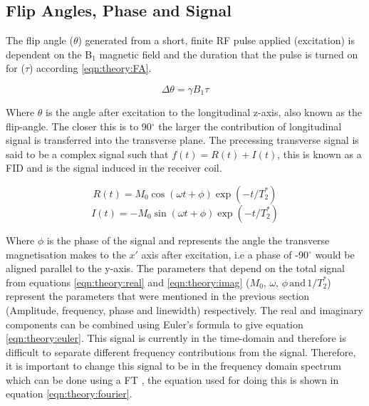 \subsection{Flip Angles, Phase and Signal}

The flip angle ($\theta$) generated from a short, finite \ac{RF} pulse applied (excitation) is dependent on the B$_1$ magnetic field and the duration that the pulse is turned on for ($\tau$) according \ref{eqn:theory:FA}.

\begin{equation}
    \Delta\theta = \gamma B_1 \tau
    \label{eqn:theory:FA}
\end{equation}

Where $\theta$ is the angle after excitation to the longitudinal z-axis, also known as the flip-angle. The closer this is to 90$^\circ$ the larger the contribution of longitudinal signal is transferred into the transverse plane. The precessing transverse signal is said to be a complex signal such that $f(t) = R(t) + I(t)$, this is known as a \ac{FID} and is the signal induced in the receiver coil.

\begin{equation}
    R(t) = M_0\cos(\omega t+ \phi)\exp(-t/T_2^*)
    \label{eqn:theory:real}
\end{equation}
\begin{equation}
    I(t) = -M_0\sin(\omega t+ \phi)\exp(-t/T_2^*)
    \label{eqn:theory:imag}
\end{equation}

Where $\phi$ is the phase of the signal and represents the angle the transverse magnetisation makes to the $x'$ axis after excitation, i.e a phase of -90$^\circ$ would be aligned parallel to the y-axis. The parameters that depend on the total signal from equations \ref{eqn:theory:real} and \ref{eqn:theory:imag} ($M_0, \, \omega, \, \phi \, \textrm{and} \, 1/T_2^*$) represent the parameters that were mentioned in the previous section (Amplitude, frequency, phase and linewidth) respectively. The real and imaginary components can be combined using Euler's formula to give equation \ref{eqn:theory:euler}. This signal is currently in the time-domain and therefore is difficult to separate different frequency contributions from the signal. Therefore, it is important to change this signal to be in the frequency domain spectrum which can be done using a \ac{FT} \cite{Fourier1822TheorieChaleur}, the equation used for doing this is shown in equation \ref{eqn:theory:fourier}.

